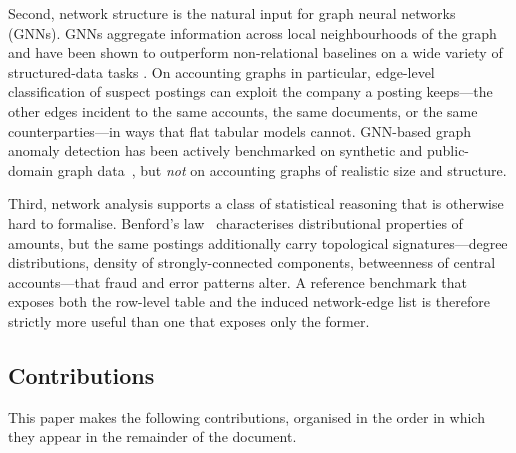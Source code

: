 Second, network structure is the natural input for graph neural
networks (GNNs).  GNNs aggregate information across local
neighbourhoods of the graph and have been shown to outperform
non-relational baselines on a wide variety of structured-data tasks
\citep{kipf2017semi,hamilton2017inductive,velickovic2018graph,xu2019gin}.
On accounting graphs in particular, edge-level classification of
suspect postings can exploit the company a posting keeps---the other
edges incident to the same accounts, the same documents, or the same
counterparties---in ways that flat tabular models cannot.  GNN-based
graph anomaly detection has been actively benchmarked on synthetic and
public-domain graph data~\citep{liu2024gadbench,tang2023bond}, but
\emph{not} on accounting graphs of realistic size and structure.

Third, network analysis supports a class of statistical reasoning that
is otherwise hard to formalise.  Benford's law~\citep{nigrini2012benfords}
characterises distributional properties of amounts, but the same
postings additionally carry topological signatures---degree
distributions, density of strongly-connected components, betweenness
of central accounts---that fraud and error patterns alter.  A reference
benchmark that exposes both the row-level table and the induced
network-edge list is therefore strictly more useful than one that
exposes only the former.

\subsection{Contributions}
\label{sec:introduction:contributions}

This paper makes the following contributions, organised in the order in
which they appear in the remainder of the document.

